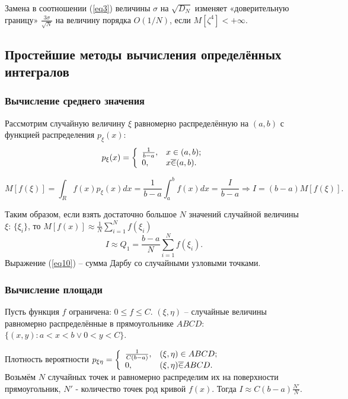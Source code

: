 \documentclass[
11pt,
master, %
subf, %
href, %
colorlinks=true, %
times, %
]{disser}
\begin{document}
Замена в соотношении (\ref{eq3}) величины $\sigma$ на $\sqrt{D_N}$ изменяет «доверительную границу» $\frac{3\sigma}{\sqrt{N}}$ на величину порядка $O(1/N)$, если $M[\zeta^4]<+\infty$.

\subsection{Простейшие методы вычисления определённых интегралов}
\subsubsection{Вычисление среднего значения}
Рассмотрим случайную величину $\xi$ равномерно распределённую на $(a,b)$ с функцией распределения $p_{\xi}(x)$:
$$p_{\xi}(x) = \left\{
                 \begin{array}{ll}
                   \frac{1}{b-a}, & \hbox{$x\in (a,b)$;} \\
                   0, & \hbox{$x\overline{\in} (a,b)$.}
                 \end{array}
               \right.
$$

$$M[f(\xi)] = \int_{R} f(x)p_{\xi}(x)dx = \frac{1}{b-a} \int_{a}^{b} f(x)dx = \frac{I}{b-a} \Rightarrow I = (b-a)M[f(\xi)].$$

Таким образом, если взять достаточно большое $N$ значений случайной величины $\xi$: $\{\xi_i\}$, то $M[f(x)] \approx \frac{1}{N} \sum_{i=1}^{N} f(\xi_i)$
\begin{equation}\label{eq10}
  I \approx Q_1 = \frac{b-a}{N}\sum_{i=1}^{N}f(\xi_i).
\end{equation}
Выражение (\ref{eq10}) -- сумма Дарбу со случайными узловыми точками.

\subsubsection{Вычисление площади}
Пусть функция $f$ ограничена: $0\leq f\leq C$. $(\xi,\eta)$ -- случайные величины равномерно распределённые в прямоугольнике $ABCD$: $\{(x,y)\colon a<x<b\vee0<y<C\}$.

Плотность вероятности $p_{\xi\eta} = \left\{
                                       \begin{array}{ll}
                                         \frac{1}{C(b-a)}, & \hbox{$(\xi,\eta) \in ABCD$;} \\
                                         0, & \hbox{$(\xi,\eta)\overline{\in}ABCD$.}
                                       \end{array}
                                     \right.$\\
Возьмём $N$ случайных точек и равномерно распределим их на поверхности прямоугольник, $N'$ - количество точек род кривой $f(x)$. Тогда $I\approx C(b-a)\frac{N'}{N}$.
\end{document}
